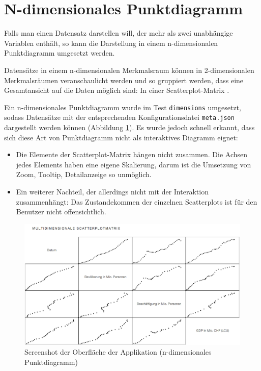 \section{N-dimensionales Punktdiagramm}

Falls man einen Datensatz darstellen will, der mehr als zwei unabhängige Variablen enthält, so kann die Darstellung in einem n-dimensionalen Punktdiagramm umgesetzt werden.

Datensätze in einem n-dimensionalen Merkmalsraum können in 2-dimensionalen Merkmalsräumen veranschaulicht werden und so gruppiert werden, dass eine Gesamtansicht auf die Daten möglich sind: In einer Scatterplot-Matrix \cite{viz}.

Ein n-dimensionales Punktdiagramm wurde im Test \texttt{dimensions} umgesetzt, sodass Datensätze mit der entsprechenden Konfigurationsdatei \texttt{meta.json} dargestellt werden können (Abbildung \ref{fig:nd}). Es wurde jedoch schnell erkannt, dass sich diese Art von Punktdiagramm nicht als interaktives Diagramm eignet:

\begin{itemize}
	\item Die Elemente der Scatterplot-Matrix hängen nicht zusammen. Die Achsen jedes Elements haben eine eigene Skalierung, darum ist die Umsetzung von Zoom, Tooltip, Detailanzeige so unmöglich.
	\item Ein weiterer Nachteil, der allerdings nicht mit der Interaktion zusammenhängt: Das Zustandekommen der einzelnen Scatterplots ist für den Benutzer nicht offensichtlich.
\end{itemize}

\begin{figure}[!htbp]
	\centering
	\includegraphics[width=\linewidth]{images/nd}
	\caption{Screenshot der Oberfläche der Applikation (n-dimensionales Punktdiagramm)}
	\label{fig:nd}
\end{figure}
